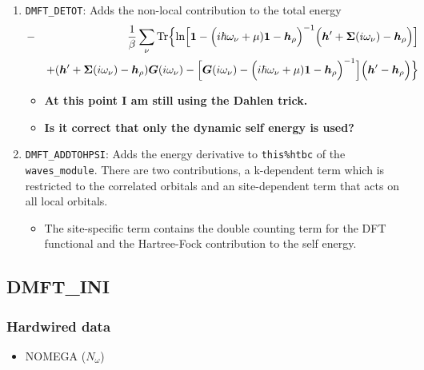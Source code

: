 \documentclass[11pt,a4paper]{report}
\begin{document}
\begin{enumerate}
%
\item \verb|DMFT_DETOT|: Adds the non-local contribution to the total energy
\begin{eqnarray}
&-&\frac{1}{\beta}\sum_\nu\mathrm{Tr}\Bigl\lbrace
\ln\Bigl[
\bm{1}-
\Bigl(i\hbar\omega_\nu+\mu)\bm{1}-\bm{h}_{\rho}\Bigr)^{-1}
\Bigl(\bm{h}'+\bm{\Sigma}(i\omega_\nu)-\bm{h}_{\rho}\Bigr)
\Bigr]
\nonumber\\&&
+(\bm{h}'+\bm{\Sigma}(i\omega_\nu)-\bm{h}_\rho)\bm{G}(i\omega_\nu)
-
\Bigl[
\bm{G}(i\omega_\nu)
-\Bigl(i\hbar\omega_\nu+\mu)\bm{1}-\bm{h}_{\rho}\Bigr)^{-1}
\Bigr]
\Bigl(\bm{h}'-\bm{h}_\rho\Bigr)\Bigr\rbrace
\end{eqnarray}
\begin{itemize}
  \item \textbf{At this point I am still using the Dahlen trick.}  
  \item \textbf{Is it correct that only the dynamic self energy is used?}
\end{itemize}
%
\item \verb|DMFT_ADDTOHPSI|: Adds the energy derivative to
  \verb|this%htbc| of the \verb|waves_module|. There are two
  contributions, a k-dependent term which is restricted to the
  correlated orbitals and an site-dependent term that acts on all
  local orbitals.
\begin{itemize}
\item The site-specific term contains the double counting term for the
  DFT functional and the Hartree-Fock contribution to the self energy.
\end{itemize}
\end{enumerate}



\subsection{DMFT\_INI}

\subsubsection{Hardwired data}
\begin{itemize}
\item NOMEGA ($N_\omega$)
\end{itemize}
\end{document}

